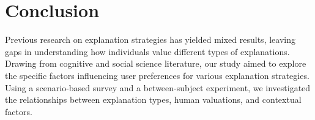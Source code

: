 \section{Conclusion}\label{sec:conclusion}



Previous research on explanation strategies has yielded mixed results, leaving gaps in understanding how individuals value different types of explanations. Drawing from cognitive and social science literature, our study aimed to explore the specific factors influencing user preferences for various explanation strategies. Using a scenario-based survey and a between-subject experiment, we investigated the relationships between explanation types, human valuations, and contextual factors.

